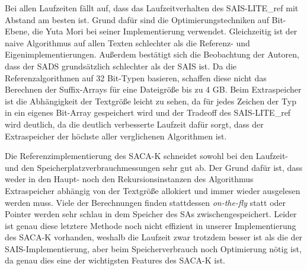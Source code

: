 \FloatBarrier
{}
\noindent Bei allen Laufzeiten fällt auf, dass das Laufzeitverhalten des SAIS-LITE\_ref mit Abstand am besten ist. Grund dafür sind die Optimierungstechniken auf Bit-Ebene, die Yuta Mori bei seiner Implementierung verwendet. Gleichzeitig ist der naive Algorithmus auf allen Texten schlechter als die Referenz- und Eigenimplementierungen. Außerdem bestätigt sich die Beobachtung der Autoren, dass der SADS grundsätzlich schlechter als der SAIS ist. Da die Referenzalgorithmen auf 32 Bit-Typen basieren, schaffen diese nicht das Berechnen der Suffix-Arrays für eine Dateigröße bis zu 4 GB. Beim Extraspeicher ist die Abhängigkeit der Textgröße leicht zu sehen, da für jedes Zeichen der Typ in ein eigenes Bit-Array gespeichert wird und der Tradeoff des SAIS-LITE\_ref wird deutlich, da die deutlich verbesserte Laufzeit dafür sorgt, dass der Extraspeicher der höchste aller verglichenen Algorithmen ist.

\noindent Die Referenzimplementierung des SACA-K schneidet sowohl bei den Laufzeit- und den Speicherplatzverbrauchmessungen sehr gut ab. Der Grund dafür ist, dass weder in den Haupt- noch den Rekursionsinstanzen des Algorithmus Extraspeicher abhängig von der Textgröße allokiert und immer wieder ausgelesen werden muss. Viele der Berechnungen finden stattdessen \textit{on-the-fly} statt oder Pointer werden sehr schlau in dem Speicher des SAs zwischengespeichert. Leider ist genau diese letztere Methode noch nicht effizient in unserer Implementierung des SACA-K vorhanden, weshalb die Laufzeit zwar trotzdem besser ist als die der SAIS-Implementierung, aber beim Speicherverbrauch noch Optimierung nötig ist, da genau dies eine der wichtigsten Features des SACA-K ist.

